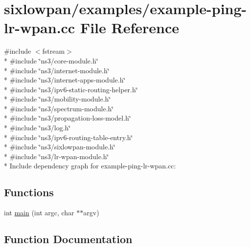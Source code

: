 \hypertarget{example-ping-lr-wpan_8cc}{}\section{sixlowpan/examples/example-\/ping-\/lr-\/wpan.cc File Reference}
\label{example-ping-lr-wpan_8cc}
{\ttfamily \#include $<$fstream$>$}\\*
{\ttfamily \#include \char`\"{}ns3/core-\/module.\+h\char`\"{}}\\*
{\ttfamily \#include \char`\"{}ns3/internet-\/module.\+h\char`\"{}}\\*
{\ttfamily \#include \char`\"{}ns3/internet-\/apps-\/module.\+h\char`\"{}}\\*
{\ttfamily \#include \char`\"{}ns3/ipv6-\/static-\/routing-\/helper.\+h\char`\"{}}\\*
{\ttfamily \#include \char`\"{}ns3/mobility-\/module.\+h\char`\"{}}\\*
{\ttfamily \#include \char`\"{}ns3/spectrum-\/module.\+h\char`\"{}}\\*
{\ttfamily \#include \char`\"{}ns3/propagation-\/loss-\/model.\+h\char`\"{}}\\*
{\ttfamily \#include \char`\"{}ns3/log.\+h\char`\"{}}\\*
{\ttfamily \#include \char`\"{}ns3/ipv6-\/routing-\/table-\/entry.\+h\char`\"{}}\\*
{\ttfamily \#include \char`\"{}ns3/sixlowpan-\/module.\+h\char`\"{}}\\*
{\ttfamily \#include \char`\"{}ns3/lr-\/wpan-\/module.\+h\char`\"{}}\\*
Include dependency graph for example-\/ping-\/lr-\/wpan.cc\+:
\subsection*{Functions}
\begin{DoxyCompactItemize}
\item 
int \hyperlink{example-ping-lr-wpan_8cc_a3c04138a5bfe5d72780bb7e82a18e627}{main} (int argc, char $\ast$$\ast$argv)
\end{DoxyCompactItemize}


\subsection{Function Documentation}
